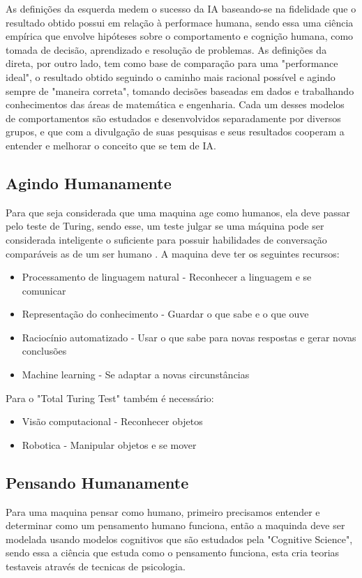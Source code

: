 \documentclass[
	12pt,				%
	openright,			%
	oneside,			%
	a4paper,			%
	english,			%
	spanish,			%
	brazil				%
	]{abntex2}
\begin{document}
	As definições da esquerda medem o sucesso da IA baseando-se na fidelidade que o resultado obtido possui em relação à performace humana, sendo essa uma ciência empírica que envolve hipóteses sobre o comportamento e cognição humana, como tomada de decisão, aprendizado e resolução de problemas. As definições da direta, por outro lado, tem como base de comparação para uma "performance ideal", o resultado obtido seguindo o caminho mais racional possível e agindo sempre de "maneira correta", tomando decisões baseadas em dados e trabalhando conhecimentos das áreas de matemática e engenharia. Cada um desses modelos de comportamentos são estudados e desenvolvidos separadamente por diversos grupos, e que com a divulgação de suas pesquisas e seus resultados cooperam a entender e melhorar o conceito que se tem de IA. \citeauthor{norvig}
	 
	\subsection*{Agindo Humanamente}
		Para que seja considerada que uma maquina age como humanos, ela deve passar pelo teste de Turing, sendo esse, um teste julgar se uma máquina pode ser considerada inteligente o suficiente para possuir habilidades de conversação comparáveis as de um ser humano \cite{turing}. A maquina deve ter os seguintes recursos:
		
		\begin{itemize}
  			\item Processamento de linguagem natural - Reconhecer a linguagem e se comunicar
  			\item Representação do conhecimento - Guardar o que sabe e o que ouve
  			\item Raciocínio automatizado - Usar o que sabe para novas respostas e gerar novas conclusões
  			\item Machine learning - Se adaptar a novas circunstâncias
  		\end{itemize}
  			
  			Para o "Total Turing Test" também é necessário:
  			
  		\begin{itemize}
  			\item Visão computacional - Reconhecer objetos
  			\item Robotica - Manipular objetos e se mover
		\end{itemize}
		
	\subsection*{Pensando Humanamente}
		Para uma maquina pensar como humano, primeiro precisamos entender e determinar como um pensamento humano funciona, então a maquinda deve ser modelada usando modelos cognitivos que são estudados pela "Cognitive Science", sendo essa a ciência que estuda como o pensamento funciona, esta cria teorias testaveis através de tecnicas de psicologia. \cite{wilson_keil}
		
\end{document}
